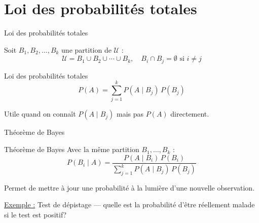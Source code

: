 \documentclass{BeamerTemplate}
\begin{document}
\section{Loi des probabilités totales}

\begin{frame}[t]{Loi des probabilités totales}

Soit $B_1, B_2, \ldots, B_k$ une \alert{partition} de $\mathcal{U}$ :
$$\mathcal{U} = B_1 \cup B_2 \cup \cdots \cup B_k, \quad B_i \cap B_j = \emptyset \text{ si } i \neq j$$

\begin{Boite}{Loi des probabilités totales}
$$P(A) = \sum_{j=1}^{k} P(A \mid B_j)\,P(B_j)$$
\end{Boite}

\medskip
Utile quand on connaît $P(A \mid B_j)$ mais pas $P(A)$ directement.

\end{frame}

\begin{frame}[t]{Théorème de Bayes}

\begin{Boite}{Théorème de Bayes}
Avec la même partition $B_1, \ldots, B_k$ :
$$P(B_i \mid A) = \frac{P(A \mid B_i)\,P(B_i)}{\displaystyle\sum_{j=1}^{k} P(A \mid B_j)\,P(B_j)}$$
\end{Boite}

\medskip
Permet de \alert{mettre à jour} une probabilité à la lumière d'une nouvelle observation.

\bigskip
\underline{Exemple :} Test de dépistage — quelle est la probabilité d'être réellement malade si le test est positif?

\end{frame}
\end{document}
